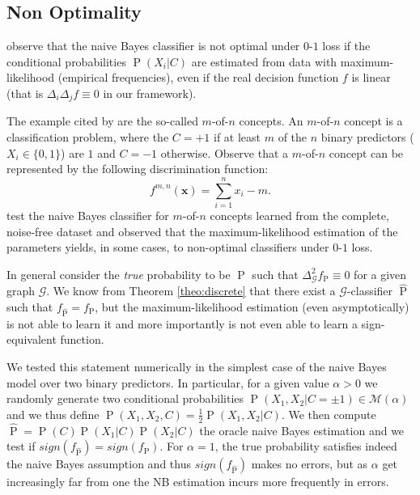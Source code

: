\documentclass[11pt,a4paper, twoside]{book}
\newcommand{\Pp}{\operatorname{P}}
\newcommand{\bx}{\mathbf{x}}
\begin{document}
\subsection{Non Optimality}


\cite{Domingos97} observe that the naive Bayes classifier is not optimal under $0$-$1$ loss if the conditional probabilities $\Pp(X_i|C)$ are estimated from data with maximum-likelihood (empirical frequencies), even if the real decision function $f$ is linear  (that is $\Delta_i\Delta_jf\equiv0$ in our framework).

The example cited by \cite{Domingos97} are the so-called $m$-of-$n$ concepts.
An $m$-of-$n$ concept is a classification problem, where the $C=+1$ if at least $m$ of the $n$ binary predictors ($X_i \in \{0,1\}$) are $1$ and $C=-1$ otherwise. Observe that a $m$-of-$n$ concept can be represented by the following discrimination function:
$$ f^{m,n}(\bx) = \sum_{i =1}^{n} x_i - m .$$ 
\cite{Domingos97} test the naive Bayes classifier for $m$-of-$n$ concepts learned from the complete, noise-free dataset and observed that the maximum-likelihood estimation of the parameters yields, in some cases, to non-optimal classifiers under $0$-$1$ loss.

In general consider the \textit{true} probability to be $\Pp$ such that $\Delta^2_{\mathcal{G}} f_{\Pp} \equiv 0$ for a given graph $\mathcal{G}$. We know from Theorem \ref{theo:discrete} that there exist a $\mathcal{G}$-classifier $\hat{\Pp}$ such that $f_{\hat{\Pp}} = f_{\Pp} $, but the maximum-likelihood estimation (even asymptotically) is not able to learn it and more importantly is not even able to learn a sign-equivalent function.

We tested this statement numerically in the simplest case of the naive Bayes model over two binary predictors. In particular, for a given value $\alpha>0$ we randomly generate two conditional probabilities $\Pp(X_1,X_2|C=\pm 1 ) \in \mathcal{M}(\alpha)$ and we thus define $\Pp(X_1,X_2,C)= \frac{1}{2}\Pp(X_1,X_2|C)$. We then compute $\hat{\Pp}=\Pp(C)\Pp(X_1|C)\Pp(X_2|C)$ the oracle naive Bayes estimation and we test if $sign(f_{\hat{\Pp}})=sign(f_{\Pp})$.
For $\alpha=1$, the true probability satisfies indeed the naive Bayes assumption and thus $sign(f_{\hat{\Pp}})$ makes no errors, but as $\alpha$ get increasingly far from one the NB estimation incurs more frequently in errors.
\end{document}
